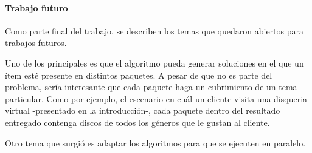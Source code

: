 \paragraph{Trabajo futuro} Como parte final del trabajo, se describen los temas que quedaron abiertos para trabajos futuros. 



Uno de los principales es que el algoritmo pueda generar soluciones en el que un ítem esté presente en distintos paquetes. A pesar de que no es parte del problema, sería interesante que cada paquete haga un cubrimiento de un tema particular. Como por ejemplo, el escenario en cuál un cliente visita una disqueria virtual -presentado en la introducción-, cada paquete dentro del resultado entregado contenga discos de todos los géneros que le gustan al cliente.

Otro tema que surgió es adaptar los algoritmos para que se ejecuten en paralelo.